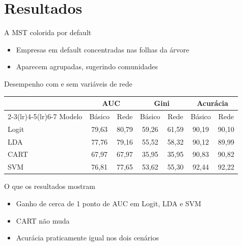 
\section{Resultados}

\begin{frame}{A MST colorida por default}
  \begin{itemize}
    \item Empresas em default concentradas nas folhas da árvore
    \item Aparecem agrupadas, sugerindo comunidades
  \end{itemize}
\end{frame}

\begin{frame}{Desempenho com e sem variáveis de rede}
  \centering
  \begin{tabular}{lcccccc}
    \toprule
    & \multicolumn{2}{c}{AUC} & \multicolumn{2}{c}{Gini} & \multicolumn{2}{c}{Acurácia} \\
    \cmidrule(lr){2-3}\cmidrule(lr){4-5}\cmidrule(lr){6-7}
    Modelo & Básico & Rede & Básico & Rede & Básico & Rede \\
    \midrule
    Logit & 79,63 & 80,79 & 59,26 & 61,59 & 90,19 & 90,10 \\
    LDA   & 77,76 & 79,16 & 55,52 & 58,32 & 90,12 & 89,99 \\
    CART  & 67,97 & 67,97 & 35,95 & 35,95 & 90,83 & 90,82 \\
    SVM   & 76,81 & 77,65 & 53,62 & 55,30 & 92,44 & 92,22 \\
    \bottomrule
  \end{tabular}
\end{frame}

\begin{frame}{O que os resultados mostram}
  \begin{itemize}
    \item Ganho de cerca de 1 ponto de AUC em Logit, LDA e SVM
    \item CART não muda
    \item Acurácia praticamente igual nos dois cenários
  \end{itemize}
\end{frame}
